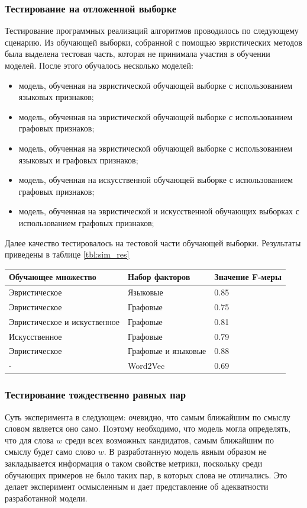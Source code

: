 \subsubsection{Тестирование на отложенной выборке}
Тестирование программных реализаций алгоритмов проводилось по следующему сценарию. Из обучающей выборки, собранной с помощью эвристических методов была выделена тестовая часть, которая не принимала участия в обучении моделей. После этого обучалось несколько моделей:
\begin{itemize}
    \item модель, обученная на эвристической обучающей выборке с использованием языковых признаков;
    \item модель, обученная на эвристической обучающей выборке с использованием графовых признаков;
    \item модель, обученная на эвристической обучающей выборке с использованием языковых и графовых признаков;
    \item модель, обученная на искусственной обучающей выборке с использованием графовых признаков;
    \item модель, обученная на эвристической и искусственной обучающих выборках с использованием графовых признаков;
\end{itemize}

Далее качество тестировалось на тестовой части обучающей выборки. Результаты приведены в таблице \ref{tbl:sim_res}

\begin{tabularx}{16cm}{|X|X|X|}
        \hline
        Обучающее множество & Набор факторов & Значение F-меры \\ \hline
        Эвристическое & Языковые & 0.85 \\ \hline
        Эвристическое & Графовые & 0.75 \\ \hline
        Эвристическое и искуственное & Графовые & 0.81 \\ \hline
        Искусственное & Графовые & 0.79 \\ \hline 
        Эвристическое & Графовые и языковые & 0.88 \\ \hline
        - & Word2Vec & 0.69 \\ \hline 
\end{tabularx}

\subsubsection{Тестирование тождественно равных пар} \label{sec:test_equal}
Суть эксперимента в следующем: очевидно, что самым ближайшим по смыслу словом является оно само. Поэтому необходимо, что модель могла определять, что для слова $w$ среди всех возможных кандидатов, самым ближайшим по смыслу будет само слово $w$. В разработанную модель явным образом не закладывается информация о таком свойстве метрики, поскольку среди обучающих примеров не было таких пар, в которых слова не отличались. Это делает эксперимент осмысленным и дает представление об адекватности разработанной модели.

